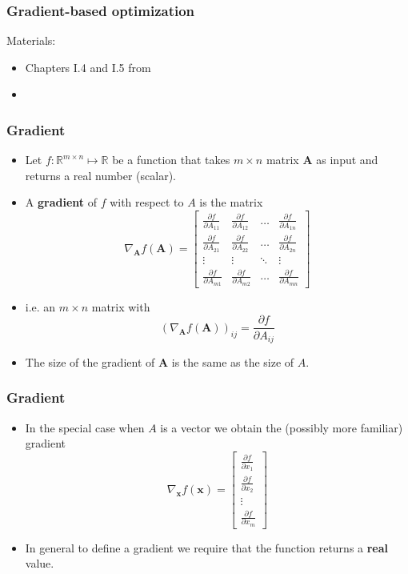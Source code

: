 \documentclass[notes]{beamer}          %
\newcommand{\vect}[1]{\bm{#1}}
\newcommand{\field}[1]{\mathbb{#1}}
\newcommand{\R}{\field{R}}
\begin{document}
\begin{frame}
\frametitle{Gradient-based optimization}
Materials:
\begin{itemize}
    \item Chapters I.4 and I.5 from \cite{deeplearning}
    \item \cite{linearalgebra}
\end{itemize}
\end{frame}

\begin{frame}
\frametitle{Gradient}
    \begin{itemize}
        \item Let $f: \R^{m \times n} \mapsto \R$ be a function that takes $m \times n$ matrix $\vect{A}$ as input and returns a real number (scalar).
        \item A {\bf gradient} of $f$ with respect to $A$ is the matrix
        $$
        \nabla_{\vect{A}} f(\vect{A}) =
        \begin{bmatrix}
         \frac{\partial f}{\partial A_{11}} & \frac{\partial f}{\partial A_{12}} & \ldots & \frac{\partial f}{\partial A_{1n}} \\
          \frac{\partial f}{\partial A_{21}} & \frac{\partial f}{\partial A_{22}} & \ldots & \frac{\partial f}{\partial A_{2n}} \\
          \vdots & \vdots & \ddots & \vdots \\
           \frac{\partial f}{\partial A_{m1}} & \frac{\partial f}{\partial A_{m2}} & \ldots & \frac{\partial f}{\partial A_{mn}}
        \end{bmatrix}
        $$
        \item i.e. an $m \times n$ matrix with  $$(\nabla_{\vect{A}} f(\vect{A}))_{ij} = \frac{\partial f}{\partial A_{ij}}  $$
        \item The size of the gradient of $\vect{A}$ is the same as the size of $A$.

    \end{itemize}
\end{frame}

\begin{frame}
\frametitle{Gradient}
    \begin{itemize}
        \item In the special case when $A$ is a vector we obtain the (possibly more familiar) gradient
        $$ \nabla_{\vect{x}} f(\vect{x}) =
        \begin{bmatrix}
         \frac{\partial f}{\partial x_{1}}  \\
          \frac{\partial f}{\partial x_{2}}  \\
          \vdots  \\
           \frac{\partial f}{\partial x_{m}}
        \end{bmatrix}$$
        \item In general to define a gradient we require that the function returns a {\bf real} value.
    \end{itemize}

\end{frame}
\end{document}
